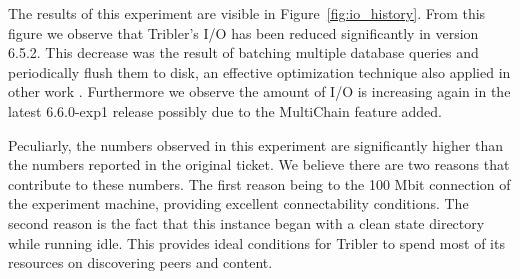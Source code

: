 The results of this experiment are visible in Figure~\ref{fig:io_history}.
From this figure we observe that Tribler's I/O has been reduced significantly in version 6.5.2.
This decrease was the result of batching multiple database queries and periodically flush them to disk, an effective optimization technique also applied in other work \cite{ouyang2011beyond, lin2009database}. 
Furthermore we observe the amount of I/O is increasing again in the latest 6.6.0-exp1 release possibly due to the MultiChain feature added. 

Peculiarly, the numbers observed in this experiment are significantly higher than the numbers reported in the original ticket.
We believe there are two reasons that contribute to these numbers.
The first reason being to the 100 Mbit connection of the experiment machine, providing excellent connectability conditions. 
The second reason is the fact that this instance began with a clean state directory while running idle.
This provides ideal conditions for Tribler to spend most of its resources on discovering peers and content.

